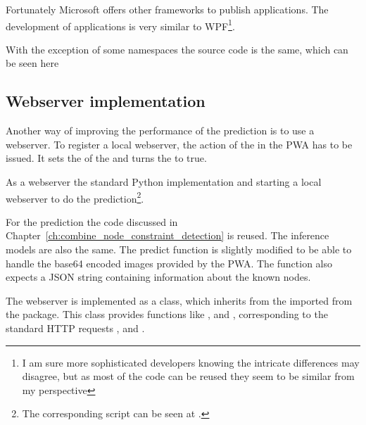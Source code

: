 Fortunately Microsoft offers other frameworks to publish applications.
The development of  applications is very similar to WPF\footnote{I am sure more sophisticated developers knowing the intricate differences may disagree, but as most of the code can be reused they seem to be similar from my perspective}.

With the exception of some namespaces the source code is the same, which can be seen here 

\subsection{Webserver implementation}

Another way of improving the performance of the prediction is to use a webserver.
To register a local webserver, the  action of the  in the PWA has to be issued.
It sets the  of the  and turns the  to true.

As a webserver the standard Python implementation and starting a local webserver to do the prediction\footnote{The corresponding script can be seen at .}.


For the prediction the code discussed in Chapter~\ref{ch:combine_node_constraint_detection} is reused.
The inference models are also the same.
The predict function is slightly modified to be able to handle the base64 encoded images provided by the PWA.
The function also expects a JSON string containing information about the known nodes.

The webserver is implemented as a  class, which inherits from the  imported from the  package.
This class provides functions like ,  and , corresponding to the standard HTTP requests ,  and .




